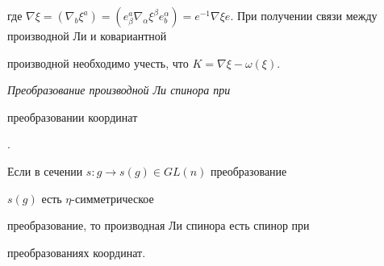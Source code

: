 где $\nabla\xi=(\nabla_b\xi^a)=(e^a_\beta\nabla_\alpha\xi^\beta e^\alpha_b)=


e^{-1}\nabla \xi e$. При получении связи между производной Ли и ковариантной 


производной необходимо учесть, что $K=\nabla\xi-\omega(\xi)$.





{\it Преобразование производной Ли спинора при


преобразовании координат}.





\begin{thm}


Если в сечении $s: g\to s(g)\in GL(n)$ преобразование


$s(g)$ есть $\eta$-симметрическое


преобразование, то производная Ли спинора есть спинор при


преобразованиях координат.


\end{thm}





